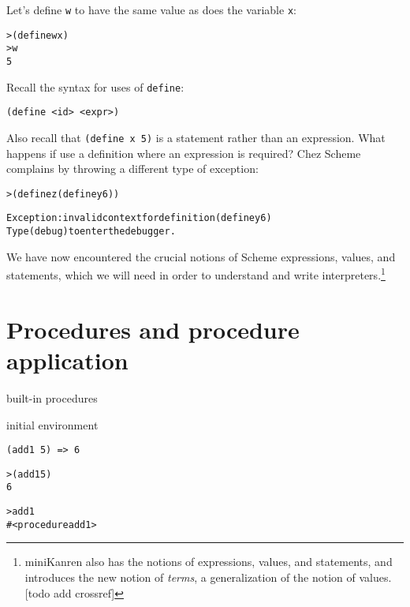 \documentclass{book}
\begin{document}
Let's define \verb|w| to have the same value as does the variable \verb|x|:

\begin{alltt}
> (define w x)
> w
5
\end{alltt}



Recall the syntax for uses of \verb|define|:

\verb|(define <id> <expr>)|

\noindent
Also recall that \verb|(define x 5)| is a statement rather than an expression.
What happens if use a definition where an expression is required?  Chez Scheme complains by throwing a different type of exception:

\begin{alltt}
> (define z (define y 6))

Exception: invalid context for definition (define y 6)
Type (debug) to enter the debugger.
\end{alltt}

We have now encountered the crucial notions of Scheme expressions, values, and statements, which we will need in order to understand and write interpreters.\footnote{miniKanren also has the notions of expressions, values, and statements, and introduces the new notion of \emph{terms}, a generalization of the notion of values. [todo add crossref]}

\section{Procedures and procedure application}

built-in procedures

initial environment

\verb|(add1 5) => 6|

\begin{alltt}
> (add1 5)
6
\end{alltt}
  
\begin{alltt}
> add1
#<procedure add1>
\end{alltt}
\end{document}
